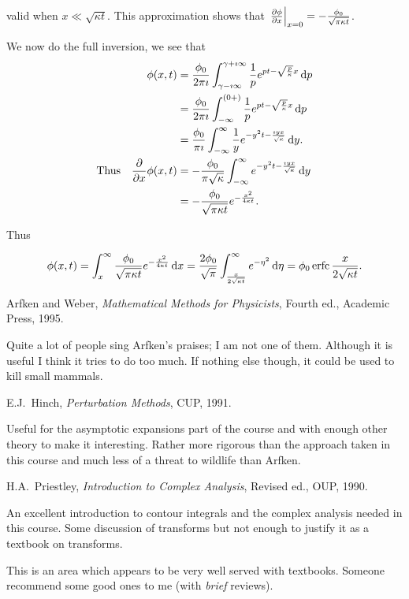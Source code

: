\documentclass{notes}
\theoremstyle{plain}
\begin{document}
valid when $x \ll \sqrt{\kappa t}$.  This approximation shows that
$\left. \frac{\partial \phi}{\partial x}\right|_{x = 0} = - \frac{\phi_0}{\sqrt{\pi \kappa t}}$.

We now do the full inversion, we see that
\begin{align*}
\phi(x,t) &= \frac{\phi_0}{2 \pi \imath} \int_{\gamma - \imath \infty}
^{\gamma + \imath \infty} \frac{1}{p} e^{p t - \sqrt{\frac{p}{\kappa}} x}
\, \mathrm{d} p \\
&= \frac{\phi_0}{2 \pi \imath} \int_{-\infty}^{(0+)}
\frac{1}{p} e^{p t - \sqrt{\frac{p}{\kappa}} x}
\, \mathrm{d} p \\
&= \frac{\phi_0}{\pi \imath} \int_{-\infty}^\infty \frac{1}{y}
e^{-y^2 t - \frac{\imath y x}{\sqrt{\kappa}}}\, \mathrm{d} y. \\
\text{Thus} \quad
\frac{\partial }{\partial x} \phi(x,t) &= - \frac{\phi_0}{\pi \sqrt{\kappa}}
\int_{-\infty}^\infty e^{-y^2 t - \frac{\imath y x}{\sqrt{\kappa}}}\, \mathrm{d} y \\
&= - \frac{\phi_0}{\sqrt{\pi \kappa t}} e^{-\frac{x^2}{4 \kappa t}}.
\end{align*}

Thus

\[
\phi(x,t) = \int_x^\infty \frac{\phi_0}{\sqrt{\pi \kappa t}}
e^{-\frac{x^2}{4 \kappa t}}\, \mathrm{d} x
= \frac{2 \phi_0}{\sqrt{\pi}} \int_{\frac{x}{2\sqrt{\kappa t}}}^\infty
e^{-\eta^2}\, \mathrm{d} \eta = \phi_0 \operatorname{erfc} \frac{x}{2 \sqrt{\kappa t}}.
\]

\backmatter

\begin{thebibliography}{9}
 Arfken and Weber, \emph{Mathematical Methods for
    Physicists}, Fourth ed., Academic Press, 1995.
  
  {\sffamily \small Quite a lot of people sing Arfken's praises; I am
    not one of them.  Although it is useful I think it tries to do too
    much.  If nothing else though, it could be used to kill small mammals. }
  
 E.J.~Hinch, \emph{Perturbation Methods}, CUP, 1991.
  
  {\sffamily \small Useful for the asymptotic expansions part of the
    course and with enough other theory to make it interesting.
    Rather more rigorous than the approach taken in this course and
    much less of a threat to wildlife than Arfken.}
  
 H.A.~Priestley, \emph{Introduction to Complex
    Analysis}, Revised ed., OUP, 1990.
  
  {\sffamily \small An excellent introduction to contour integrals and
    the complex analysis needed in this course.  Some discussion of
    transforms but not enough to justify it as a textbook on
    transforms. }

\end{thebibliography}

This is an area which appears to be very well served with textbooks.  Someone
recommend some good ones to me (with \emph{brief} reviews).
\end{document}
